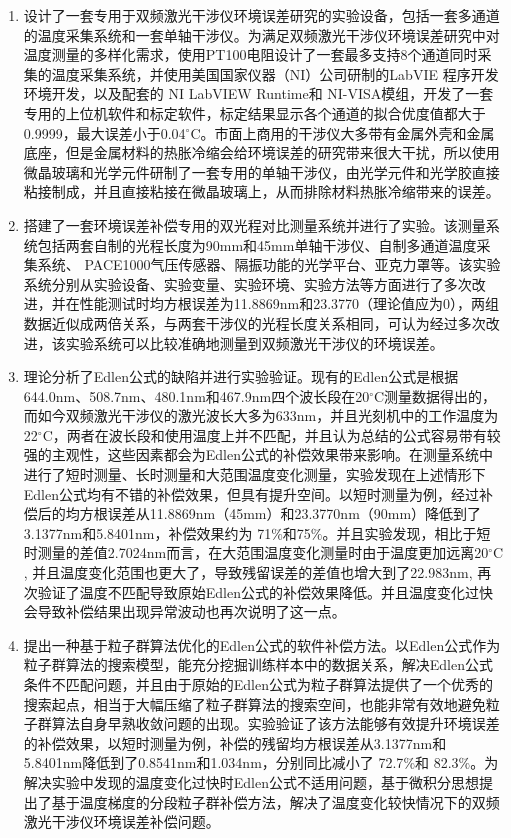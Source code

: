 \begin{enumerate}
    \item 设计了一套专用于双频激光干涉仪环境误差研究的实验设备，包括一套多通道的温度采集系统和一套单轴干涉仪。为满足双频激光干涉仪环境误差研究中对温度测量的多样化需求，使用PT100电阻设计了一套最多支持8个通道同时采集的温度采集系统，并使用美国国家仪器（NI）公司研制的LabVIE 程序开发环境开发，以及配套的 NI LabVIEW Runtime和 NI-VISA模组，开发了一套专用的上位机软件和标定软件，标定结果显示各个通道的拟合优度值都大于0.9999，最大误差小于0.04$^{\circ} \mathrm{C}$。市面上商用的干涉仪大多带有金属外壳和金属底座，但是金属材料的热胀冷缩会给环境误差的研究带来很大干扰，所以使用微晶玻璃和光学元件研制了一套专用的单轴干涉仪，由光学元件和光学胶直接粘接制成，并且直接粘接在微晶玻璃上，从而排除材料热胀冷缩带来的误差。
    \item 搭建了一套环境误差补偿专用的双光程对比测量系统并进行了实验。该测量系统包括两套自制的光程长度为90mm和45mm单轴干涉仪、自制多通道温度采集系统、 PACE1000气压传感器、隔振功能的光学平台、亚克力罩等。该实验系统分别从实验设备、实验变量、实验环境、实验方法等方面进行了多次改进，并在性能测试时均方根误差为11.8869nm和23.3770（理论值应为0），两组数据近似成两倍关系，与两套干涉仪的光程长度关系相同，可认为经过多次改进，该实验系统可以比较准确地测量到双频激光干涉仪的环境误差。
    \item 理论分析了Edlen公式的缺陷并进行实验验证。现有的Edlen公式是根据644.0nm、508.7nm、480.1nm和467.9nm四个波长段在20$^{\circ}\mathrm{C}$测量数据得出的，而如今双频激光干涉仪的激光波长大多为633nm，并且光刻机中的工作温度为22$^{\circ} \mathrm{C}$，两者在波长段和使用温度上并不匹配，并且认为总结的公式容易带有较强的主观性，这些因素都会为Edlen公式的补偿效果带来影响。在测量系统中进行了短时测量、长时测量和大范围温度变化测量，实验发现在上述情形下Edlen公式均有不错的补偿效果，但具有提升空间。以短时测量为例，经过补偿后的均方根误差从11.8869nm（45mm）和23.3770nm（90mm）降低到了3.1377nm和5.8401nm，补偿效果约为 71$\%$和75$\%$。并且实验发现，相比于短时测量的差值2.7024nm而言，在大范围温度变化测量时由于温度更加远离20$^{\circ} \mathrm{C}$, 并且温度变化范围也更大了，导致残留误差的差值也增大到了22.983nm, 再次验证了温度不匹配导致原始Edlen公式的补偿效果降低。并且温度变化过快会导致补偿结果出现异常波动也再次说明了这一点。
    \item 提出一种基于粒子群算法优化的Edlen公式的软件补偿方法。以Edlen公式作为粒子群算法的搜索模型，能充分挖掘训练样本中的数据关系，解决Edlen公式条件不匹配问题，并且由于原始的Edlen公式为粒子群算法提供了一个优秀的搜索起点，相当于大幅压缩了粒子群算法的搜索空间，也能非常有效地避免粒子群算法自身早熟收敛问题的出现。实验验证了该方法能够有效提升环境误差的补偿效果，以短时测量为例，补偿的残留均方根误差从3.1377nm和5.8401nm降低到了0.8541nm和1.034nm，分别同比减小了 72.7$\%$和 82.3$\%$。为解决实验中发现的温度变化过快时Edlen公式不适用问题，基于微积分思想提出了基于温度梯度的分段粒子群补偿方法，解决了温度变化较快情况下的双频激光干涉仪环境误差补偿问题。

\end{enumerate}
